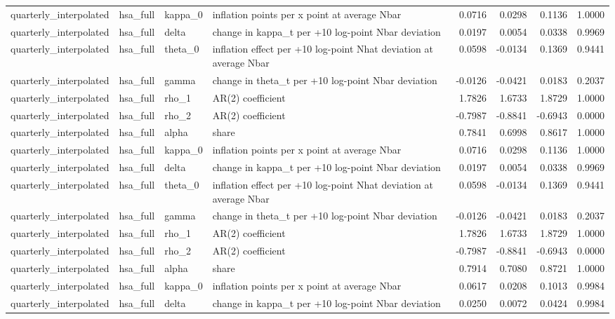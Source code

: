 \begin{tabular}{llllrrrr}
quarterly\_interpolated & hsa\_full & kappa\_0 & inflation points per x point at average Nbar & 0.0716 & 0.0298 & 0.1136 & 1.0000 \\
quarterly\_interpolated & hsa\_full & delta & change in kappa\_t per +10 log-point Nbar deviation & 0.0197 & 0.0054 & 0.0338 & 0.9969 \\
quarterly\_interpolated & hsa\_full & theta\_0 & inflation effect per +10 log-point Nhat deviation at average Nbar & 0.0598 & -0.0134 & 0.1369 & 0.9441 \\
quarterly\_interpolated & hsa\_full & gamma & change in theta\_t per +10 log-point Nbar deviation & -0.0126 & -0.0421 & 0.0183 & 0.2037 \\
quarterly\_interpolated & hsa\_full & rho\_1 & AR(2) coefficient & 1.7826 & 1.6733 & 1.8729 & 1.0000 \\
quarterly\_interpolated & hsa\_full & rho\_2 & AR(2) coefficient & -0.7987 & -0.8841 & -0.6943 & 0.0000 \\
quarterly\_interpolated & hsa\_full & alpha & share & 0.7841 & 0.6998 & 0.8617 & 1.0000 \\
quarterly\_interpolated & hsa\_full & kappa\_0 & inflation points per x point at average Nbar & 0.0716 & 0.0298 & 0.1136 & 1.0000 \\
quarterly\_interpolated & hsa\_full & delta & change in kappa\_t per +10 log-point Nbar deviation & 0.0197 & 0.0054 & 0.0338 & 0.9969 \\
quarterly\_interpolated & hsa\_full & theta\_0 & inflation effect per +10 log-point Nhat deviation at average Nbar & 0.0598 & -0.0134 & 0.1369 & 0.9441 \\
quarterly\_interpolated & hsa\_full & gamma & change in theta\_t per +10 log-point Nbar deviation & -0.0126 & -0.0421 & 0.0183 & 0.2037 \\
quarterly\_interpolated & hsa\_full & rho\_1 & AR(2) coefficient & 1.7826 & 1.6733 & 1.8729 & 1.0000 \\
quarterly\_interpolated & hsa\_full & rho\_2 & AR(2) coefficient & -0.7987 & -0.8841 & -0.6943 & 0.0000 \\
quarterly\_interpolated & hsa\_full & alpha & share & 0.7914 & 0.7080 & 0.8721 & 1.0000 \\
quarterly\_interpolated & hsa\_full & kappa\_0 & inflation points per x point at average Nbar & 0.0617 & 0.0208 & 0.1013 & 0.9984 \\
quarterly\_interpolated & hsa\_full & delta & change in kappa\_t per +10 log-point Nbar deviation & 0.0250 & 0.0072 & 0.0424 & 0.9984 \\

\end{tabular}
